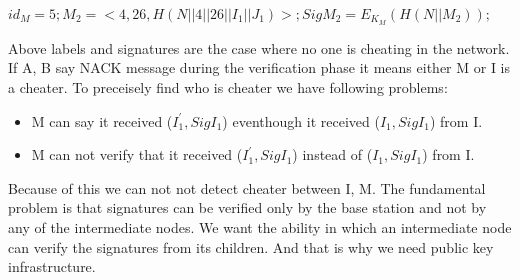 	$id_{M} = 5; M_{2} = <4, 26, H(N||4||26||I_{1}||J_{1})>; Sig M_{2} = E_{K_{M}}(H(N||M_{2})); $

	Above labels and signatures are the case where no one is cheating in the network. If A, B say NACK message during the verification phase it means either M or I is a cheater. To preceisely find who is cheater we have following problems:

	\begin{itemize}
		\item M can say it received ($I_{1}^{'}, Sig I_{1}$) eventhough it received ($I_{1}, Sig I_{1}$) from I.
		\item M can not verify that it received ($I_{1}^{'}, Sig I_{1}$) instead of ($I_{1}, Sig I_{1}$) from I.
	\end{itemize}
	Because of this we can not not detect cheater between I, M. The fundamental problem is that signatures can be verified only by the base station and not by any of the intermediate nodes. We want the ability in which an intermediate node can verify the signatures from its children. And that is why we need public key infrastructure.
